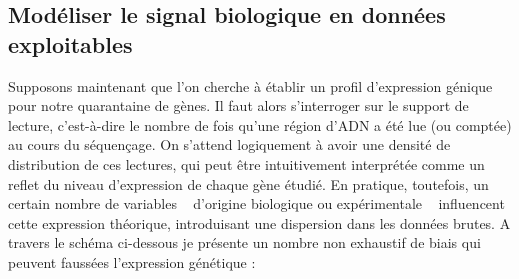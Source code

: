 \subsection{Modéliser le signal biologique en données exploitables}

Supposons maintenant que l’on cherche à établir un profil d’expression génique pour notre quarantaine de gènes. 
Il faut alors s’interroger sur le support de lecture, c’est-à-dire le nombre de fois qu’une région d’ADN a été lue (ou comptée) au cours du séquençage.
On s'attend logiquement à avoir une densité de distribution de ces lectures, qui peut être intuitivement interprétée comme un reflet du niveau d’expression de chaque gène étudié.
En pratique, toutefois, un certain nombre de variables \textemdash ~ d’origine biologique ou expérimentale \textemdash ~ influencent cette expression théorique, introduisant une dispersion dans les données brutes.
A travers le schéma ci-dessous je présente un nombre non exhaustif de biais qui peuvent faussées l'expression génétique : 

